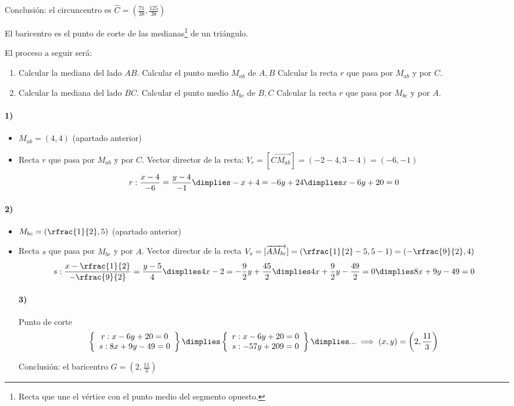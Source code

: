 \documentclass[palatino,nosec,nochap,nobuilddate]{Docencia}
\begin{document}
\begin{problem}[57]
Conclusión: el circuncentro es $\hat{C} = \left(\frac{71}{38},\frac{125}{38}\right)$

\spart El baricentro es el punto de corte de las medianas\footnote{Recta que une el vértice con el punto medio del segmento opuesto.} de un triángulo.


El proceso a seguir será:
\begin{enumerate}
	\item Calcular la mediana del lado $AB$.
	\subitem Calcular el punto medio $M_{ab}$ de $A,B$
	\subitem Calcular la recta $r$ que pasa por $M_{ab}$ y por $C$.
	\item Calcular la mediana del lado $BC$.
	\subitem Calcular el punto medio $M_{bc}$ de $B,C$
	\subitem Calcular la recta $r$ que pasa por $M_{bc}$ y por $A$.
\end{enumerate}

\paragraph{1)}
\begin{itemize}
	\item $M_{ab} = (4,4)$ (apartado anterior)
	\item Recta $r$ que pasa por $M_{ab}$ y por $C$.
	\subitem Vector director de la recta: $V_r = [\overrightarrow{CM_{ab}}] = \left(-2-4,3-4\right) = (-6,-1)$
	\[r: \frac{x-4}{-6} = \frac{y-4}{-1} \dimplies -x+4 = -6y+24 \dimplies x-6y+20 = 0\]
\end{itemize}
\paragraph{2)}
\begin{itemize}
	\item $M_{bc} = (\rfrac{1}{2},5)$ (apartado anterior)
	\item Recta $s$ que pasa por $M_{bc}$ y por $A$.
	\subitem Vector director de la recta $V_s = [\overrightarrow{AM_{bc}}] = (\rfrac{1}{2} - 5,5-1) = (-\rfrac{9}{2},4)$
	\[
		s: \frac{x-\rfrac{1}{2}}{-\rfrac{9}{2}} = \frac{y-5}{4} \dimplies 4x-2 = -\frac{9}{2}y+\frac{45}{2} \dimplies 4x+\frac{9}{2}y - \frac{49}{2} = 0 \dimplies 8x+9y-49=0
	\]

\paragraph{3)} {Punto de corte}
\[
\left\{
	\begin{array}{c}
		r: x-6y+20 = 0\\
		s: 8x+9y-49=0
	\end{array}
\right\} \dimplies 
\left\{
	\begin{array}{c}
		r: x-6y+20 = 0\\
		s: -57y + 209= 0
	\end{array}
\right\} \dimplies ... \implies (x,y) = \left(2,\frac{11}{3}\right)
\]

Conclusión: el baricentro $G = \displaystyle\left(2,\frac{11}{3}\right)$

\end{itemize}
\end{problem}
\end{document}
